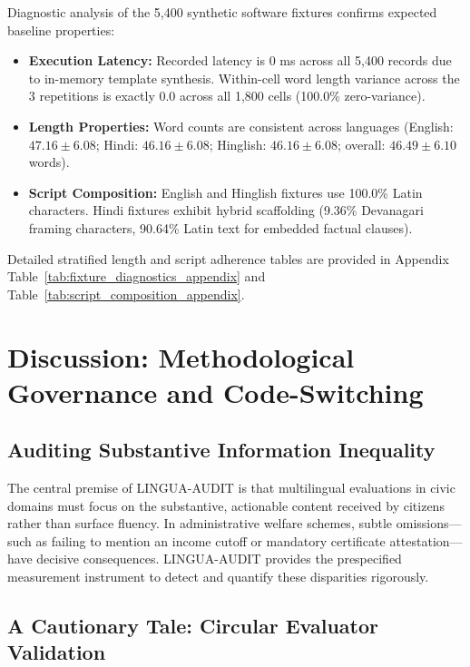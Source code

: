 \documentclass[11pt,a4paper]{article}
\begin{document}
Diagnostic analysis of the 5,400 synthetic software fixtures confirms expected baseline properties:
\begin{itemize}
  \item \textbf{Execution Latency:} Recorded latency is 0 ms across all 5,400 records due to in-memory template synthesis. Within-cell word length variance across the 3 repetitions is exactly 0.0 across all 1,800 cells (100.0\% zero-variance).
  \item \textbf{Length Properties:} Word counts are consistent across languages (English: $47.16 \pm 6.08$; Hindi: $46.16 \pm 6.08$; Hinglish: $46.16 \pm 6.08$; overall: $46.49 \pm 6.10$ words).
  \item \textbf{Script Composition:} English and Hinglish fixtures use 100.0\% Latin characters. Hindi fixtures exhibit hybrid scaffolding (9.36\% Devanagari framing characters, 90.64\% Latin text for embedded factual clauses).
\end{itemize}
Detailed stratified length and script adherence tables are provided in Appendix Table~\ref{tab:fixture_diagnostics_appendix} and Table~\ref{tab:script_composition_appendix}.

\section{Discussion: Methodological Governance and Code-Switching}
\label{sec:discussion}

\subsection{Auditing Substantive Information Inequality}
\label{sec:discussion_inequality}

The central premise of LINGUA-AUDIT is that multilingual evaluations in civic domains must focus on the substantive, actionable content received by citizens rather than surface fluency. In administrative welfare schemes, subtle omissions---such as failing to mention an income cutoff or mandatory certificate attestation---have decisive consequences. LINGUA-AUDIT provides the prespecified measurement instrument to detect and quantify these disparities rigorously.

\subsection{A Cautionary Tale: Circular Evaluator Validation}
\label{sec:discussion_cautionary}
\end{document}
